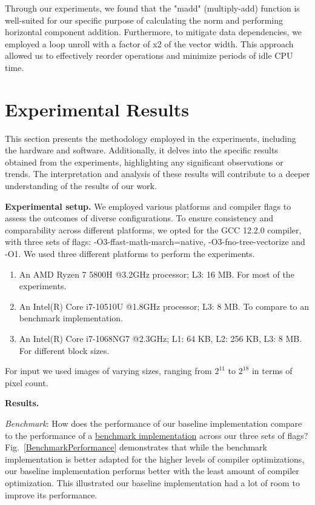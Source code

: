 \documentclass[letterpaper]{article}
\newcommand{\mypar}[1]{{\bf #1.}}
\newcommand{\inline}[1]{{\ttfamily\hyphenchar\font=45 #1}}
\begin{document}
Through our experiments, we found that the "madd" (multiply-add) function is well-suited for our specific purpose of calculating the norm and performing horizontal component addition.
Furthermore, to mitigate data dependencies, we employed a loop unroll with a factor of x2 of the vector width. This approach allowed us to effectively reorder operations and minimize periods of idle CPU time. 

\section{Experimental Results}\label{sec:exp}

This section presents the methodology employed in the experiments, including the hardware and software. Additionally, it delves into the specific results obtained from the experiments, highlighting any significant observations or trends. The interpretation and analysis of these results will contribute to a deeper understanding of the results of our work.

\mypar{Experimental setup} 
We employed various platforms and compiler flags to assess the outcomes of diverse configurations. To ensure consistency and comparability across different platforms, we opted for the GCC 12.2.0 compiler, with three sets of flags: \inline{-O3-ffast-math-march=native}, \inline{-O3-fno-tree-vectorize} and \inline{-O1}. We used three different platforms to perform the experiments.
\begin{enumerate}[leftmargin=*,itemsep=0pt,topsep=0pt]
  \item An AMD Ryzen 7 5800H @3.2GHz processor; L3: 16 MB. For most of the experiments.
  \item An Intel(R) Core i7-10510U @1.8GHz processor; L3: 8 MB. To compare to an benchmark implementation.
  \item An Intel(R) Core i7-1068NG7 @2.3GHz; L1: 64 KB, L2: 256 KB, L3: 8 MB. For different block sizes.
\end{enumerate}
For input we used images of varying sizes, ranging from $2^{11}$ to $2^{18}$ in terms of pixel count.

\mypar{Results}

\textit{Benchmark}: How does the performance of our baseline implementation compare to the performance of a \href{https://github.com/AirGuanZ/ImageQuilting}{benchmark implementation} across our three sets of flags? Fig.~\ref{BenchmarkPerformance} demonstrates that while the benchmark implementation is better adapted for the higher levels of compiler optimizations, our baseline implementation performs better with the least amount of compiler optimization. This illustrated our baseline implementation had a lot of room to improve its performance.
\end{document}
